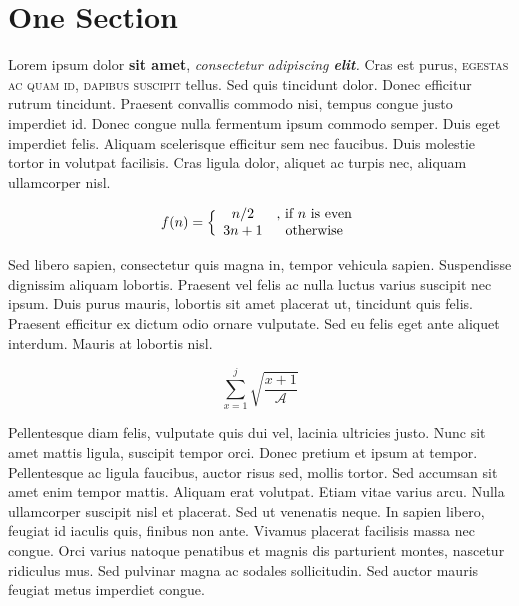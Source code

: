 
\section{One Section}

Lorem ipsum dolor \textbf{sit amet}, \textit{consectetur adipiscing \textbf{elit}.} 
Cras est
purus, \textsc{egestas ac quam id, dapibus suscipit} tellus. Sed quis tincidunt
dolor. Donec efficitur rutrum tincidunt. Praesent convallis commodo
nisi, tempus congue justo imperdiet id. Donec congue nulla fermentum
ipsum commodo semper. Duis eget imperdiet felis. Aliquam scelerisque
efficitur sem nec faucibus. Duis molestie tortor in volutpat
facilisis. Cras ligula dolor, aliquet ac turpis nec, aliquam
ullamcorper nisl.

\[
  f(n) = \Big\{\begin{array}{c c}
           n/2 & \text{, if $n$ is even} \\
           3n + 1 & \text{otherwise}
         \end{array}
\]

Sed libero sapien, consectetur quis magna in, tempor vehicula
sapien. Suspendisse dignissim aliquam lobortis. Praesent vel felis ac
nulla luctus varius suscipit nec ipsum. Duis purus mauris, lobortis
sit amet placerat ut, tincidunt quis felis. Praesent efficitur ex
dictum odio ornare vulputate. Sed eu felis eget ante aliquet
interdum. Mauris at lobortis nisl.

\[
  \sum_{x=1}^{j} \sqrt{\frac{x + 1}{\mathcal{A}}}
\]

Pellentesque diam felis, vulputate quis dui vel, lacinia ultricies
justo. Nunc sit amet mattis ligula, suscipit tempor orci. Donec
pretium et ipsum at tempor. Pellentesque ac ligula faucibus, auctor
risus sed, mollis tortor. Sed accumsan sit amet enim tempor
mattis. Aliquam erat volutpat. Etiam vitae varius arcu. Nulla
ullamcorper suscipit nisl et placerat. Sed ut venenatis neque. In
sapien libero, feugiat id iaculis quis, finibus non ante. Vivamus
placerat facilisis massa nec congue. Orci varius natoque penatibus et
magnis dis parturient montes, nascetur ridiculus mus. Sed pulvinar
magna ac sodales sollicitudin. Sed auctor mauris feugiat metus
imperdiet congue.

